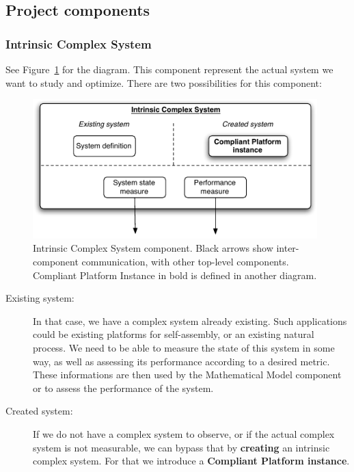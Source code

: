 \documentclass[letterpaper, oneside]{article}
\begin{document}
\subsection{Project components} %
\label{sub:project_components}

\subsubsection{Intrinsic Complex System} %
\label{ssub:intrinsic_complex_system}

See Figure~\ref{fig:img_intrinsic_complex_system} for the diagram. This component represent the actual system we want to study and optimize. There are two possibilities for this component:

\begin{figure}[h!]
	\centering
		\includegraphics[width=11cm]{img/intrinsic_complex_system.pdf}
	\caption{Intrinsic Complex System component. Black arrows show inter-component communication, with other top-level components. Compliant Platform Instance in bold is defined in another diagram.}
	\label{fig:img_intrinsic_complex_system}
\end{figure}

\begin{description}
	\item[Existing system:] In that case, we have a complex system already existing. Such applications could be existing platforms for self-assembly, or an existing natural process. We need to be able to measure the state of this system in some way, as well as assessing its performance according to a desired metric. These informations are then used by the Mathematical Model component or to assess the performance of the system.
	\item[Created system:] If we do not have a complex system to observe, or if the actual complex system is not measurable, we can bypass that by \textbf{creating} an intrinsic complex system. For that we introduce a \textbf{Compliant Platform instance}.
\end{description}
\end{document}
